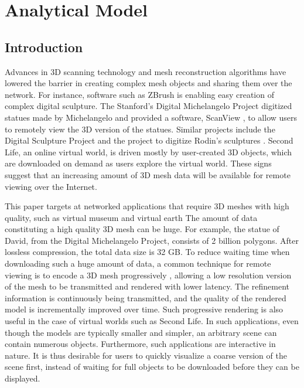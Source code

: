 \chapter{Analytical Model}
\label{c:model}
\def\tracea{UDP-High_result}
\def\traceb{UDP-Low_result}
\def\tracec{DCCP_result}
\def\mesha{Happy}
\def\meshb{Horse}
\def\meshc{Thai}
\def\mesh_h{Happy2}

\section{Introduction}
\label{s:model:intro}
    Advances in 3D scanning technology and mesh reconstruction
    algorithms have lowered the barrier in creating complex mesh
    objects and sharing them over the network.  For instance,
    software such as
    ZBrush is enabling easy creation of complex digital sculpture.
    The Stanford's Digital Michelangelo Project
    \cite{levoy00digital} digitized statues made by Michelangelo
    and provided a software, ScanView \cite{koller04protected},
    to allow users to remotely view the 3D version of the statues.
    Similar projects include the Digital Sculpture Project \cite{deroos2004dsp}
    and the project to digitize Rodin's sculptures \cite{miyazaki2006dab}. 
    Second Life, an online virtual world, is driven mostly by 
    user-created 3D objects, which are downloaded 
    on demand as users explore the virtual world.  
    These signs suggest that an increasing amount of
    3D mesh data will be available for remote viewing over
    the Internet.

    This paper targets at networked applications that require 3D meshes with high quality,
    such as virtual museum and virtual earth
    The amount of data constituting a high quality 3D mesh can be
    huge. For example, the statue of David, from the Digital
    Michelangelo Project, consists of 2 billion polygons.  After
    lossless compression, the total data size is 32 GB.  To reduce
    waiting time when downloading such a huge amount of data, a common
    technique for remote viewing is to encode a 3D mesh
    progressively \cite{lod}, allowing a low resolution version
    of the mesh to be transmitted and rendered with lower latency.
    The refinement information is continuously being transmitted,
    and the quality of the rendered model is incrementally improved
    over time.  Such progressive rendering is also useful in the
    case of virtual worlds such as Second Life. 
    In such applications, even though the models are typically smaller and simpler, 
    an arbitrary scene can contain numerous objects.
    Furthermore, such applications are interactive in nature.
    It is thus desirable for users to quickly visualize a coarse version
    of the scene first, instead of waiting for full objects to be
    downloaded before they can be displayed.

